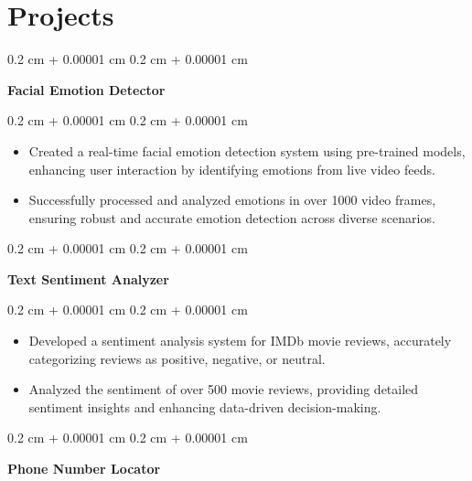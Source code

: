 \documentclass[12pt, letterpaper]{article}
\newenvironment{highlights}{
    \begin{itemize}[
        topsep=0.10 cm,
        parsep=0.10 cm,
        partopsep=0pt,
        itemsep=0pt,
        leftmargin=0.4 cm + 10pt
    ]
}{
    \end{itemize}
} %
\newenvironment{onecolentry}{
    \begin{adjustwidth}{
        0.2 cm + 0.00001 cm
    }{
        0.2 cm + 0.00001 cm
    }
}{
    \end{adjustwidth}
} %
\begin{document}
    
    \section{Projects}



        
        \begin{onecolentry}
            \textbf{Facial Emotion Detector}
        \end{onecolentry}

        \vspace{0.10 cm}
        \begin{onecolentry}
            \begin{highlights}
                \item Created a real-time facial emotion detection system using pre-trained models, enhancing user interaction by identifying emotions from live video feeds.
                \item Successfully processed and analyzed emotions in over 1000 video frames, ensuring robust and accurate emotion detection across diverse scenarios.
            \end{highlights}
        \end{onecolentry}


        \vspace{0.2 cm}

        \begin{onecolentry}
            \textbf{Text Sentiment Analyzer}
        \end{onecolentry}

        \vspace{0.10 cm}
        \begin{onecolentry}
            \begin{highlights}
                \item Developed a sentiment analysis system for IMDb movie reviews, accurately categorizing reviews as positive, negative, or neutral.
                \item Analyzed the sentiment of over 500 movie reviews, providing detailed sentiment insights and enhancing data-driven decision-making.
            \end{highlights}
        \end{onecolentry}


        \vspace{0.2 cm}

        \begin{onecolentry}
            \textbf{Phone Number Locator}
        \end{onecolentry}
\end{document}
